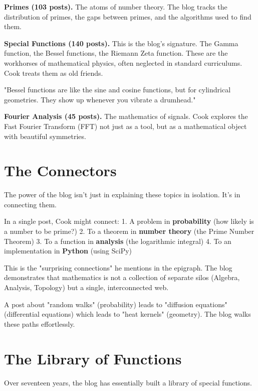 \textbf{Primes (103 posts).} The atoms of number theory. The blog tracks the distribution of primes, the gaps between primes, and the algorithms used to find them.

\textbf{Special Functions (140 posts).} This is the blog's signature. The Gamma function, the Bessel functions, the Riemann Zeta function. These are the workhorses of mathematical physics, often neglected in standard curriculums. Cook treats them as old friends.

\begin{blogquote}
"Bessel functions are like the sine and cosine functions, but for cylindrical geometries. They show up whenever you vibrate a drumhead."
\end{blogquote}

\textbf{Fourier Analysis (45 posts).} The mathematics of signals. Cook explores the Fast Fourier Transform (FFT) not just as a tool, but as a mathematical object with beautiful symmetries.

\bigskip

\section*{The Connectors}

The power of the blog isn't just in explaining these topics in isolation. It's in connecting them.

In a single post, Cook might connect:
1. A problem in \textbf{probability} (how likely is a number to be prime?)
2. To a theorem in \textbf{number theory} (the Prime Number Theorem)
3. To a function in \textbf{analysis} (the logarithmic integral)
4. To an implementation in \textbf{Python} (using SciPy)

This is the "surprising connections" he mentions in the epigraph. The blog demonstrates that mathematics is not a collection of separate silos (Algebra, Analysis, Topology) but a single, interconnected web.

A post about "random walks" (probability) leads to "diffusion equations" (differential equations) which leads to "heat kernels" (geometry). The blog walks these paths effortlessly.

\bigskip

\section*{The Library of Functions}

Over seventeen years, the blog has essentially built a library of special functions.

